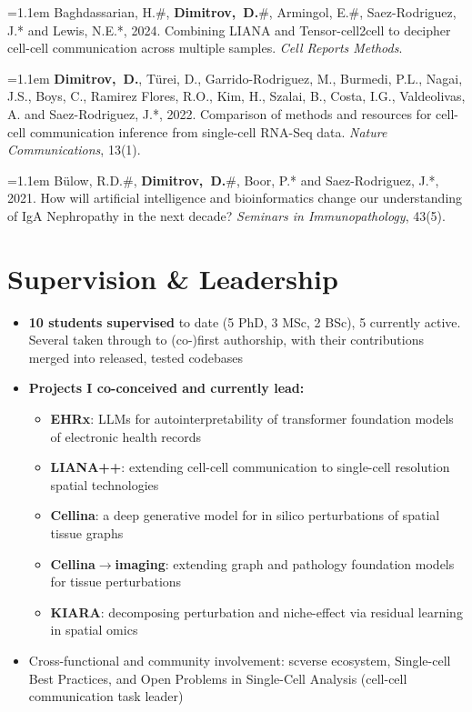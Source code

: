 \documentclass[11pt,a4paper]{article}
\newenvironment{cvitems}
  {\begin{itemize}[leftmargin=1.05em,itemsep=3.5pt,parsep=0pt,topsep=3.5pt,label={\color{accent}\small\textbullet}]}
  {\end{itemize}\vspace{7pt}}
\newcommand{\pub}[1]{\par\hangindent=1.1em\hangafter=1 #1\vspace{9pt}}
\newcommand{\me}{\textbf{Dimitrov,~D.}}
\begin{document}
\pub{Baghdassarian, H.\#, \me\#, Armingol, E.\#, Saez-Rodriguez, J.* and Lewis, N.E.*, 2024.
Combining LIANA and Tensor-cell2cell to decipher cell-cell communication across
multiple samples. \textit{Cell Reports Methods}.}

\pub{\me, T\"urei, D., Garrido-Rodriguez, M., Burmedi, P.L., Nagai, J.S., Boys, C.,
Ramirez Flores, R.O., Kim, H., Szalai, B., Costa, I.G., Valdeolivas, A. and Saez-Rodriguez, J.*, 2022.
Comparison of methods and resources for cell-cell communication inference from
single-cell RNA-Seq data. \textit{Nature Communications}, 13(1).}

\pub{B\"ulow, R.D.\#, \me\#, Boor, P.* and Saez-Rodriguez, J.*, 2021.
How will artificial intelligence and bioinformatics change our understanding of
IgA Nephropathy in the next decade? \textit{Seminars in Immunopathology}, 43(5).}

\section{Supervision \& Leadership}
\begin{cvitems}
  \item \textbf{10 students supervised} to date (5 PhD, 3 MSc, 2 BSc), 5 currently active. Several taken
        through to (co-)first authorship, with their contributions merged into released, tested codebases
  \item \textbf{Projects I co-conceived and currently lead:}
        \begin{itemize}[leftmargin=1.05em,itemsep=3pt,parsep=0pt,topsep=4pt,label={\color{accent}\scriptsize\textbullet}]
          \item \textbf{EHRx}: LLMs for autointerpretability of transformer foundation models of electronic health records
          \item \textbf{LIANA++}: extending cell-cell communication to single-cell resolution spatial technologies
          \item \textbf{Cellina}: a deep generative model for in silico perturbations of spatial tissue graphs
          \item \textbf{Cellina$\to$imaging}: extending graph and pathology foundation models for tissue perturbations
          \item \textbf{KIARA}: decomposing perturbation and niche-effect via residual learning in spatial omics
        \end{itemize}
  \item Cross-functional and community involvement: scverse ecosystem, Single-cell Best Practices,
        and Open Problems in Single-Cell Analysis (cell-cell communication task leader)
\end{cvitems}
\end{document}
